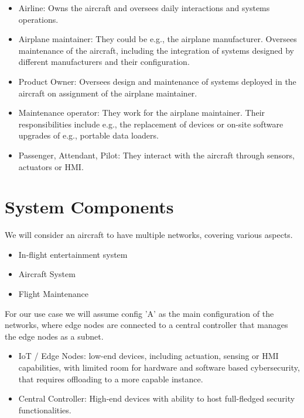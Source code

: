 \begin{itemize}
	\item Airline:
	      Owns the aircraft and oversees daily interactions and systems operations.
	\item Airplane maintainer: They could be e.g., the airplane manufacturer. Oversees maintenance of the aircraft,
	      including the integration of systems designed by different manufacturers and their configuration.
	\item Product Owner: Oversees design and maintenance of systems deployed in the aircraft on assignment of the
	      airplane maintainer.
	\item Maintenance operator: They work for the airplane maintainer. Their responsibilities include e.g.,
	      the replacement of devices or on-site software upgrades of e.g., portable data loaders.
	\item Passenger, Attendant, Pilot: They interact with the aircraft through sensors, actuators or HMI.
\end{itemize}


\section{System Components} %
\label{sec:System Components}

We will consider an aircraft to have multiple networks, covering various aspects.
\begin{itemize}
	\item In-flight entertainment system
	\item Aircraft System
	\item Flight Maintenance
\end{itemize}

For our use case we will assume config 'A' as the main configuration of the networks, where edge nodes are connected to
a central controller that manages the edge nodes as a subnet.
\begin{itemize}
	\item IoT / Edge Nodes: low-end devices, including actuation, sensing or HMI capabilities, with limited
	      room for hardware and software based cybersecurity, that requires offloading to a more capable
	      instance.
	\item Central Controller: High-end devices with ability to host full-fledged security functionalities.
\end{itemize}

